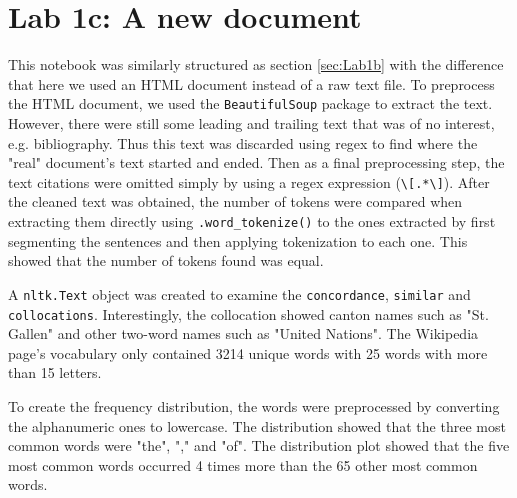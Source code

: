\documentclass[onecolumn]{article}
\begin{document}
\section{Lab 1c: A new document}
This notebook was similarly structured as section \ref{sec:Lab1b} with the difference that here we used an HTML document instead of a raw text file. To preprocess the HTML document, we used the \verb|BeautifulSoup| package to extract the text. However, there were still some leading and trailing text that was of no interest, e.g. bibliography. Thus this text was discarded using regex to find where the "real" document's text started and ended. Then as a final preprocessing step, the text citations were omitted simply by using a regex expression (\verb|\[.*\]|). After the cleaned text was obtained, the number of tokens were compared when extracting them directly using \verb|.word_tokenize()| to the ones extracted by first segmenting the sentences and then applying tokenization to each one. This showed that the number of tokens found was equal. 

A \verb|nltk.Text| object was created to examine the \verb|concordance|, \verb|similar| and \verb|collocations|. Interestingly, the collocation showed canton names such as "St. Gallen" and other two-word names such as "United Nations". The Wikipedia page's vocabulary only contained 3214 unique words with 25 words with more than 15 letters. 

To create the frequency distribution, the words were preprocessed by converting the alphanumeric ones to lowercase. The distribution showed that the three most common words were "the", "," and "of". The distribution plot showed that the five most common words occurred 4 times more than the 65 other most common words.
\end{document}
